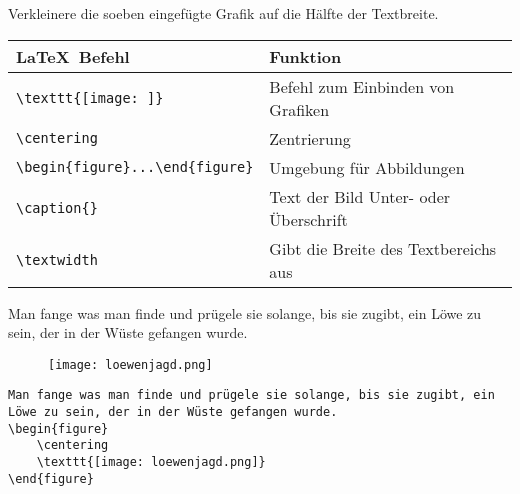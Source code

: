 \begin{frame}[fragile]
	\begin{Aufgabe}
		Verkleinere die soeben eingefügte Grafik auf die Hälfte der Textbreite.
	\end{Aufgabe}
	
	\btVFill\Befehle
	\begin{center}
		\begin{tabular}{ll}
			\toprule
			\LaTeX\ Befehl								&	Funktion								\\ \midrule
			\lstinline|\texttt{[image: ]}|			&	Befehl zum Einbinden von Grafiken		\\ 
			\lstinline|\centering|						&	Zentrierung								\\
			\lstinline|\begin{figure}...\end{figure}|	&	Umgebung für Abbildungen				\\
			\lstinline|\caption{}|						&	Text der Bild Unter- oder Überschrift	\\
			\lstinline|\textwidth|						&	Gibt die Breite des Textbereichs aus	\\
			\bottomrule
		\end{tabular}
	\end{center}
	\vspace{0.1cm}
\end{frame}
\begin{frame}[fragile]
	\Losung
	\begin{outputbox}
		Man fange was man finde und prügele sie solange, bis sie zugibt, ein Löwe zu sein, der in der Wüste gefangen wurde.
		\begin{figure}[H]
			\centering
			\texttt{[image: loewenjagd.png]}
		\end{figure}
	\end{outputbox}
	
	\Code
	\begin{lstlisting}
Man fange was man finde und prügele sie solange, bis sie zugibt, ein Löwe zu sein, der in der Wüste gefangen wurde.
\begin{figure}
	\centering
	\texttt{[image: loewenjagd.png]}
\end{figure}
	\end{lstlisting}
\end{frame}
